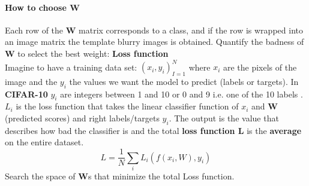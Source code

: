 \documentclass[11pt]{article}
\begin{document}
\paragraph{How to choose W }
Each row  of the $\mathbf{W }$ matrix  corresponds to a class, and if the row is wrapped into an image matrix the  template blurry images is obtained.
Quantify the badness of  $\mathbf{W }$ to select the best weight: \textbf{Loss function}\\


Imagine to have a training data set: ${(x_i,y_i)}_{I = 1}^N$ where $x_i$  are the pixels of the image and the $y_i$  the values we want the model to predict (labels or targets).
In \textbf{CIFAR-10 } $y_i$ are integers between 1 and 10 or 0 and 9 i.e. one of the 10 labels .
$L_i$ is the loss function that takes the linear classifier function of $x_i$ and $\mathbf{W }$ (predicted scores) and right labels/targets $y_i$. The output is the value that describes how bad the classifier is and the total \textbf{loss function L} is the \textbf{average} on the entire dataset.
\begin{equation}
    L= \frac{1}{N}\sum_{i} L_i (f(x_i,W),y_i)
\end{equation}{}
Search the space of \textbf{W}s that minimize the total Loss function.
\end{document}

